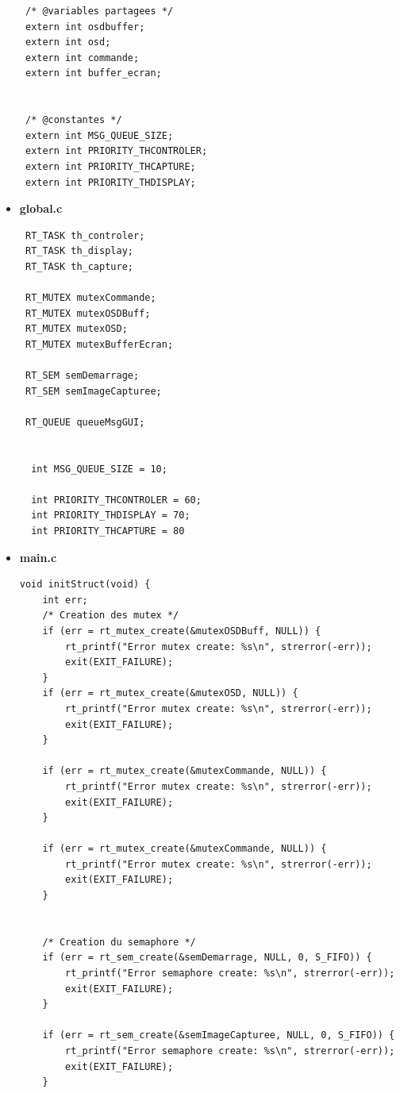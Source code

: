 \documentclass[11pt, a4paper]{paper}
\begin{document}
\begin{itemize}
\begin{lstlisting}
 /* @variables partagees */
 extern int osdbuffer;
 extern int osd;
 extern int commande;
 extern int buffer_ecran;


 /* @constantes */
 extern int MSG_QUEUE_SIZE;
 extern int PRIORITY_THCONTROLER;
 extern int PRIORITY_THCAPTURE;
 extern int PRIORITY_THDISPLAY;
\end{lstlisting}


\item \large{\bf global.c}

\lstset{language=C} 
\begin{lstlisting}
 RT_TASK th_controler;
 RT_TASK th_display;
 RT_TASK th_capture;

 RT_MUTEX mutexCommande;
 RT_MUTEX mutexOSDBuff;
 RT_MUTEX mutexOSD;
 RT_MUTEX mutexBufferEcran;

 RT_SEM semDemarrage;
 RT_SEM semImageCapturee;

 RT_QUEUE queueMsgGUI;


  int MSG_QUEUE_SIZE = 10;

  int PRIORITY_THCONTROLER = 60;
  int PRIORITY_THDISPLAY = 70;
  int PRIORITY_THCAPTURE = 80
\end{lstlisting}

\item \large{\bf main.c}

\lstset{language=C} 
\begin{lstlisting}
void initStruct(void) {
    int err;
    /* Creation des mutex */
    if (err = rt_mutex_create(&mutexOSDBuff, NULL)) {
        rt_printf("Error mutex create: %s\n", strerror(-err));
        exit(EXIT_FAILURE);
    }
    if (err = rt_mutex_create(&mutexOSD, NULL)) {
        rt_printf("Error mutex create: %s\n", strerror(-err));
        exit(EXIT_FAILURE);
    }

    if (err = rt_mutex_create(&mutexCommande, NULL)) {
        rt_printf("Error mutex create: %s\n", strerror(-err));
        exit(EXIT_FAILURE);
    }

    if (err = rt_mutex_create(&mutexCommande, NULL)) {
        rt_printf("Error mutex create: %s\n", strerror(-err));
        exit(EXIT_FAILURE);
    }


    /* Creation du semaphore */
    if (err = rt_sem_create(&semDemarrage, NULL, 0, S_FIFO)) {
        rt_printf("Error semaphore create: %s\n", strerror(-err));
        exit(EXIT_FAILURE);
    }

    if (err = rt_sem_create(&semImageCapturee, NULL, 0, S_FIFO)) {
        rt_printf("Error semaphore create: %s\n", strerror(-err));
        exit(EXIT_FAILURE);
    }


\end{lstlisting}
\end{itemize}
\end{document}
